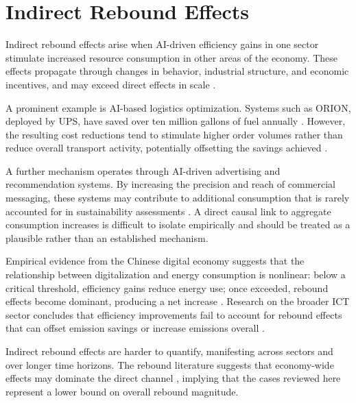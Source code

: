 \section{Indirect Rebound Effects}
\label{sec:indirect}

Indirect rebound effects arise when AI-driven efficiency gains
in one sector stimulate increased resource consumption in other
areas of the economy. These effects propagate through changes in
behavior, industrial structure, and economic incentives, and may
exceed direct effects in scale \cite{luccioni2025}.

A prominent example is AI-based logistics optimization. Systems
such as ORION, deployed by UPS, have saved over ten million
gallons of fuel annually \cite{mhlanga2025}. However, the
resulting cost reductions tend to stimulate higher order volumes
rather than reduce overall transport activity, potentially
offsetting the savings achieved \cite{mhlanga2025,luccioni2025}.

A further mechanism operates through AI-driven advertising and
recommendation systems. By increasing the precision and reach
of commercial messaging, these systems may contribute to
additional consumption that is rarely accounted for in
sustainability assessments \cite{luccioni2025}. A direct causal
link to aggregate consumption increases is difficult to isolate
empirically and should be treated as a plausible rather than
an established mechanism.

Empirical evidence from the Chinese digital economy suggests
that the relationship between digitalization and energy
consumption is nonlinear: below a critical threshold, efficiency
gains reduce energy use; once exceeded, rebound effects become
dominant, producing a net increase \cite{chen2025}. Research
on the broader ICT sector concludes that efficiency improvements
fail to account for rebound effects that can offset emission
savings or increase emissions overall \cite{widdicks2023}.

Indirect rebound effects are harder to quantify, manifesting
across sectors and over longer time horizons. The rebound
literature suggests that economy-wide effects may dominate the
direct channel \cite{sorrell2009}, implying that the cases
reviewed here represent a lower bound on overall rebound
magnitude.
